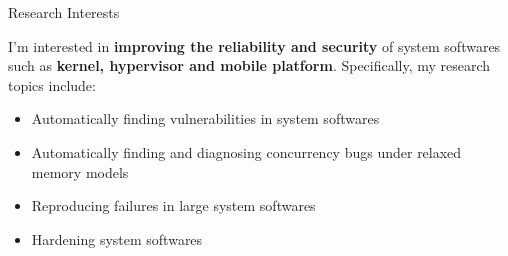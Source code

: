 \begin{rSection}{Research Interests}
\newcommand{\eg}{\textit{e}.\textit{g}.\xspace}

I'm interested in \textbf{improving the reliability and security} of
system softwares such as \textbf{kernel, hypervisor and mobile
  platform}. Specifically, my research topics include:

\begin{itemize}[leftmargin=*,itemsep=-5pt]
\item{Automatically finding vulnerabilities in system softwares}
\item{Automatically finding and diagnosing concurrency bugs under relaxed memory models}
\item{Reproducing failures in large system softwares}
\item{Hardening system softwares}
\end{itemize}

\end{rSection}
